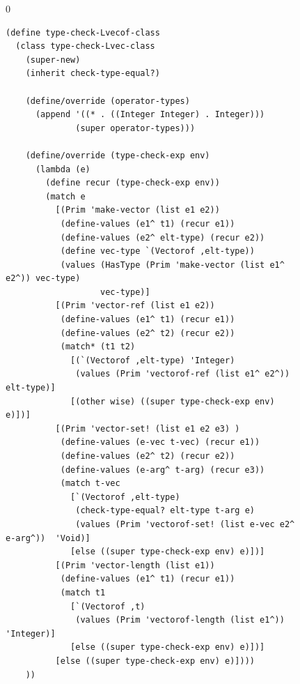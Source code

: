 \documentclass[7x10]{TimesAPriori_MIT}%
\def\racketEd{0}
\def\edition{0}
\numberwithin{theorem}{chapter}
\numberwithin{definition}{chapter}
\numberwithin{equation}{chapter}
\begin{document}
\begin{figure}[tbp]
  \begin{tcolorbox}[colback=white]
{\if\edition\racketEd    
    \begin{lstlisting}[basicstyle=\ttfamily\footnotesize]
(define type-check-Lvecof-class
  (class type-check-Lvec-class
    (super-new)
    (inherit check-type-equal?)

    (define/override (operator-types)
      (append '((* . ((Integer Integer) . Integer)))
              (super operator-types)))
    
    (define/override (type-check-exp env)
      (lambda (e)
        (define recur (type-check-exp env))
        (match e
          [(Prim 'make-vector (list e1 e2))
           (define-values (e1^ t1) (recur e1))
           (define-values (e2^ elt-type) (recur e2))
           (define vec-type `(Vectorof ,elt-type))
           (values (HasType (Prim 'make-vector (list e1^ e2^)) vec-type)
                   vec-type)]
          [(Prim 'vector-ref (list e1 e2))
           (define-values (e1^ t1) (recur e1))
           (define-values (e2^ t2) (recur e2))
           (match* (t1 t2)
             [(`(Vectorof ,elt-type) 'Integer)
              (values (Prim 'vectorof-ref (list e1^ e2^)) elt-type)]
             [(other wise) ((super type-check-exp env) e)])]
          [(Prim 'vector-set! (list e1 e2 e3) )
           (define-values (e-vec t-vec) (recur e1))
           (define-values (e2^ t2) (recur e2))
           (define-values (e-arg^ t-arg) (recur e3))
           (match t-vec
             [`(Vectorof ,elt-type)
              (check-type-equal? elt-type t-arg e)
              (values (Prim 'vectorof-set! (list e-vec e2^ e-arg^))  'Void)]
             [else ((super type-check-exp env) e)])]
          [(Prim 'vector-length (list e1))
           (define-values (e1^ t1) (recur e1))
           (match t1
             [`(Vectorof ,t)
              (values (Prim 'vectorof-length (list e1^))  'Integer)]
             [else ((super type-check-exp env) e)])]
          [else ((super type-check-exp env) e)])))
    ))


\end{lstlisting}}
\end{tcolorbox}
\end{figure}
\end{document}
